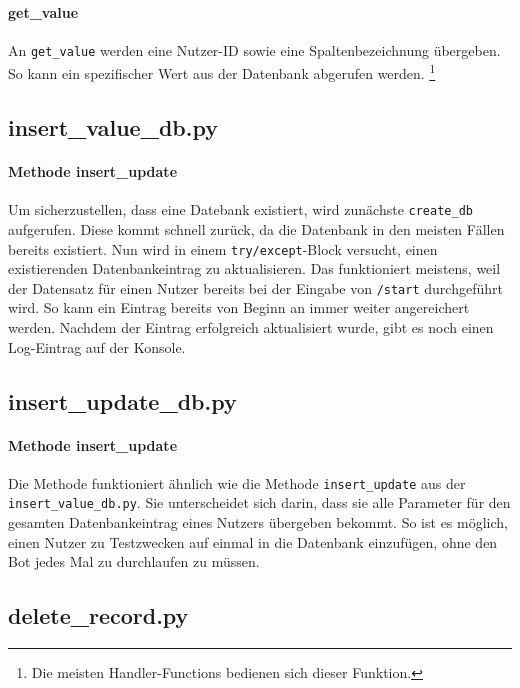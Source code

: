             \paragraph{get\_value}
                An \verb|get_value| werden eine Nutzer-ID sowie eine Spaltenbezeichnung übergeben. So kann ein spezifischer Wert aus der Datenbank abgerufen werden. \footnote{Die meisten Handler-Functions bedienen sich dieser Funktion.} 

        \subsection{insert\_value\_db.py} \label{insert_value_db.py}
            \paragraph{Methode insert\_update}
                Um sicherzustellen, dass eine Datebank existiert, wird zunächste \verb|create_db| aufgerufen. Diese kommt schnell zurück, da die Datenbank in den meisten Fällen bereits existiert. Nun wird in einem \verb|try/except|-Block versucht, einen existierenden Datenbankeintrag zu aktualisieren. Das funktioniert meistens, weil der Datensatz für einen Nutzer bereits bei der Eingabe von \verb|/start| durchgeführt wird. So kann ein Eintrag bereits von Beginn an immer weiter angereichert werden. Nachdem der Eintrag erfolgreich aktualisiert wurde, gibt es noch einen Log-Eintrag auf der Konsole.  
        
        \subsection{insert\_update\_db.py} \label{insert_update_db.py}
            \paragraph{Methode insert\_update}
                Die Methode funktioniert ähnlich wie die Methode \verb|insert_update| aus der \verb|insert_value_db.py|. Sie unterscheidet sich darin, dass sie alle Parameter für den gesamten Datenbankeintrag eines Nutzers übergeben bekommt. So ist es möglich, einen Nutzer zu Testzwecken auf einmal in die Datenbank einzufügen, ohne den Bot jedes Mal zu durchlaufen zu müssen.
        
        \subsection{delete\_record.py} \label{delete_record.py}
